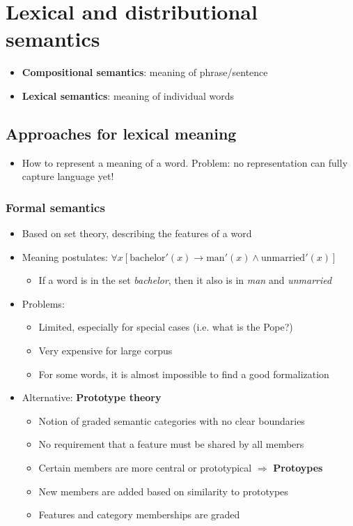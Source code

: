 \section{Lexical and distributional semantics}
\begin{itemize}
	\item \textbf{Compositional semantics}: meaning of phrase/sentence
	\item \textbf{Lexical semantics}: meaning of individual words
\end{itemize}
\subsection{Approaches for lexical meaning}
\begin{itemize}
	\item How to represent a meaning of a word. Problem: no representation can fully capture language yet!
\end{itemize}
\subsubsection{Formal semantics}
\begin{itemize}
	\item Based on set theory, describing the features of a word
	\item Meaning postulates: $\forall x \left[\text{bachelor}'(x)\to\text{man}'(x)\wedge\text{unmarried}'(x)\right]$
	\begin{itemize}
		\item If a word is in the set \textit{bachelor}, then it also is in \textit{man} and \textit{unmarried}
	\end{itemize}
	\item Problems:
	\begin{itemize}
		\item Limited, especially for special cases (i.e. what is the Pope?)
		\item Very expensive for large corpus
		\item For some words, it is almost impossible to find a good formalization
	\end{itemize}
	\item Alternative: \textbf{Prototype theory}
	\begin{itemize}
		\item Notion of graded semantic categories with no clear boundaries
		\item No requirement that a feature must be shared by all members
		\item Certain members are more central or prototypical $\Rightarrow$ \textbf{Protoypes}
		\item New members are added based on similarity to prototypes
		\item Features and category memberships are graded
	\end{itemize}
\end{itemize}
